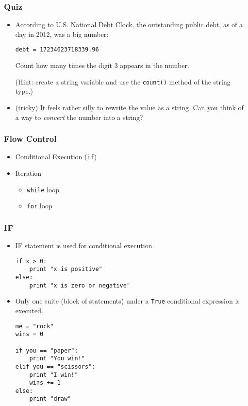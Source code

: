 \documentclass{beamer}
\begin{document}
\begin{frame}[fragile]
\frametitle{Quiz}
\begin{itemize}
\item According to U.S. National Debt Clock,
      the outstanding public debt, as of 
      a day in 2012, was a big number:
\begin{lstlisting}
debt = 17234623718339.96
\end{lstlisting}
      Count how many times the digit 3 appears
      in the number.

      (Hint: create a string variable and use
       the \lstinline{count()} method of
       the string type.)  
\item<3-> (tricky) It feels rather silly to rewrite the
          value as a string.
          Can you think of a way to \emph{convert}
          the number into a string? 
\end{itemize}
\end{frame}

\begin{frame}[fragile]
\frametitle{Flow Control}
\begin{itemize}
\item Conditional Execution (\lstinline{if})
\item Iteration
\begin{itemize}
\item \lstinline{while} loop
\item \lstinline{for} loop
\end{itemize}
\end{itemize}
\end{frame}

\begin{frame}[fragile]
\frametitle{IF}
\begin{itemize}
\item IF statement is used for conditional execution.
\begin{lstlisting}
if x > 0:
    print "x is positive"
else:
    print "x is zero or negative" 
\end{lstlisting}
\item Only one suite (block of statements) under a
      \lstinline{True} conditional expression is executed.
\begin{lstlisting}
me = "rock"
wins = 0

if you == "paper":
    print "You win!"
elif you == "scissors":
    print "I win!"
    wins += 1
else:
    print "draw"      
\end{lstlisting}
\end{itemize}
\end{frame}
\end{document}
